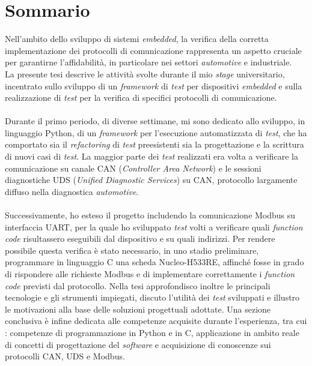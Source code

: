 \cleardoublepage
{}
{}
\begingroup
\let\clearpage\relax
\let\cleardoublepage\relax
\chapter*{Sommario}
\noindent
Nell'ambito dello sviluppo di sistemi \textit{embedded}, la verifica della corretta implementazione dei protocolli di comunicazione rappresenta un aspetto cruciale per garantirne l'affidabilità, in particolare nei settori \textit{automotive} e industriale.\\
La presente tesi descrive le attività svolte durante il mio \textit{stage} universitario, incentrato sullo sviluppo di un \textit{framework} di \textit{test} per dispositivi \textit{embedded} e sulla realizzazione di \textit{test} per la verifica di specifici protocolli di comunicazione.\\\\
Durante il primo periodo, di diverse settimane, mi sono dedicato allo sviluppo, in linguaggio Python, di un \textit{framework} per l'esecuzione automatizzata di \textit{test}, che ha comportato sia il \textit{refactoring} di \textit{test} preesistenti sia la progettazione e la scrittura di nuovi casi di \textit{test}.
La maggior parte dei \textit{test} realizzati era volta a verificare la comunicazione su canale CAN (\textit{Controller Area Network}) e le sessioni diagnostiche UDS (\textit{Unified Diagnostic Services}) su CAN, protocollo largamente diffuso nella diagnostica \textit{automotive}.\\\\
Successivamente, ho esteso il progetto includendo la comunicazione Modbus su interfaccia UART, per la quale ho sviluppato \textit{test} volti a verificare quali \textit{function code} risultassero eseguibili dal dispositivo e su quali indirizzi.
Per rendere possibile questa verifica è stato necessario, in uno stadio preliminare, programmare in linguaggio C una scheda Nucleo-H533RE, affinché fosse in grado di rispondere alle richieste Modbus e di implementare correttamente i \textit{function code} previsti dal protocollo.
\newpage
\noindent
Nella tesi approfondisco inoltre le principali tecnologie e gli strumenti impiegati, discuto l'utilità dei \textit{test} sviluppati e illustro le motivazioni alla base delle soluzioni progettuali adottate.
Una sezione conclusiva è infine dedicata alle competenze acquisite durante l'esperienza, tra cui : competenze di programmazione in Python e in C, applicazione in ambito reale di concetti di progettazione del \textit{software} e acquisizione di conoscenze sui protocolli CAN, UDS e Modbus.
